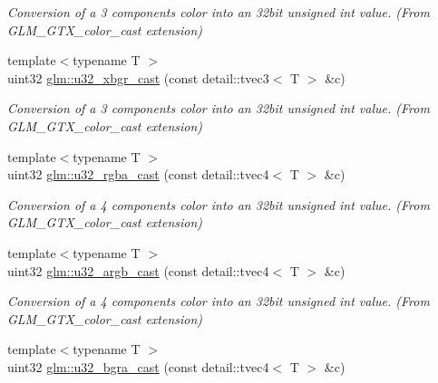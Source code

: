 \begin{DoxyCompactItemize}
\begin{DoxyCompactList}\small\item\em Conversion of a 3 components color into an 32bit unsigned int value. (From G\+L\+M\+\_\+\+G\+T\+X\+\_\+color\+\_\+cast extension) \end{DoxyCompactList}\item 
\hypertarget{group__gtx__color__cast_ga6a44ecd022166716b9fd00dfeb3688be}{}{\footnotesize template$<$typename T $>$ }\\uint32 \hyperlink{group__gtx__color__cast_ga6a44ecd022166716b9fd00dfeb3688be}{glm\+::u32\+\_\+xbgr\+\_\+cast} (const detail\+::tvec3$<$ T $>$ \&c)\label{group__gtx__color__cast_ga6a44ecd022166716b9fd00dfeb3688be}

\begin{DoxyCompactList}\small\item\em Conversion of a 3 components color into an 32bit unsigned int value. (From G\+L\+M\+\_\+\+G\+T\+X\+\_\+color\+\_\+cast extension) \end{DoxyCompactList}\item 
\hypertarget{group__gtx__color__cast_ga66026c23e16f6ceab8b99e2a844c7f05}{}{\footnotesize template$<$typename T $>$ }\\uint32 \hyperlink{group__gtx__color__cast_ga66026c23e16f6ceab8b99e2a844c7f05}{glm\+::u32\+\_\+rgba\+\_\+cast} (const detail\+::tvec4$<$ T $>$ \&c)\label{group__gtx__color__cast_ga66026c23e16f6ceab8b99e2a844c7f05}

\begin{DoxyCompactList}\small\item\em Conversion of a 4 components color into an 32bit unsigned int value. (From G\+L\+M\+\_\+\+G\+T\+X\+\_\+color\+\_\+cast extension) \end{DoxyCompactList}\item 
\hypertarget{group__gtx__color__cast_ga2c41583a6b660d7f70e7b078f7144aeb}{}{\footnotesize template$<$typename T $>$ }\\uint32 \hyperlink{group__gtx__color__cast_ga2c41583a6b660d7f70e7b078f7144aeb}{glm\+::u32\+\_\+argb\+\_\+cast} (const detail\+::tvec4$<$ T $>$ \&c)\label{group__gtx__color__cast_ga2c41583a6b660d7f70e7b078f7144aeb}

\begin{DoxyCompactList}\small\item\em Conversion of a 4 components color into an 32bit unsigned int value. (From G\+L\+M\+\_\+\+G\+T\+X\+\_\+color\+\_\+cast extension) \end{DoxyCompactList}\item 
\hypertarget{group__gtx__color__cast_gac6b23c9c3dd2578dd77c8a23a9c77185}{}{\footnotesize template$<$typename T $>$ }\\uint32 \hyperlink{group__gtx__color__cast_gac6b23c9c3dd2578dd77c8a23a9c77185}{glm\+::u32\+\_\+bgra\+\_\+cast} (const detail\+::tvec4$<$ T $>$ \&c)\label{group__gtx__color__cast_gac6b23c9c3dd2578dd77c8a23a9c77185}


\end{DoxyCompactItemize}
